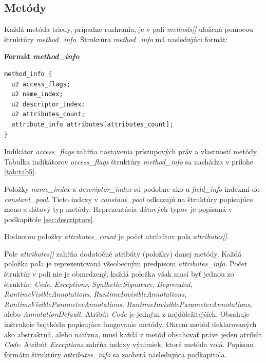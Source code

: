 \documentclass[11pt,final,oneside]{fithesis}
\newenvironment{example}[1]
{
\vspace{3mm}
\noindent\textbf{#1}
\vspace{2mm}
}
{
\vspace{3mm}
}
\begin{document}
\subsection{Metódy}
\label{sec:methods}
Každá metóda triedy, prípadne rozhrania, je v poli \textit{methods[]} uložená
pomocou štruktúry \textit{method\_info}. Štruktúra \textit{method\_info} má
nasledujúci formát:

\begin{example}{Formát \textit{method\_info}}
\begin{verbatim}
method_info {
  u2 access_flags;
  u2 name_index;
  u2 descriptor_index;
  u2 attributes_count;
  attribute_info attributes[attributes_count];
}
\end{verbatim}
\end{example}

Indikátor \textit{access\_flags} zahŕňa nastavenia prístupových práv a
vlastností metódy. Tabuľka indikátorov \textit{access\_flags} štruktúry
\textit{method\_info} sa nachádza v prílohe \ref{tab:tab5}.

Položky \textit{name\_index} a \textit{descriptor\_index} sú podobne ako u
\textit{field\_info} indexmi do \textit{constant\_pool}. Tieto indexy
v \textit{constant\_pool} odkazujú na štruktúry popisujúce meno a dátový typ
metódy. Reprezentácia dátových typov je popísaná v podkapitole
\ref{sec:descriptors}.

Hodnotou položky \textit{attributes\_count} je počet atribútov
poľa \textit{attributes[]}.

Pole \textit{attributes[]} zahŕňa dodatočné atribúty (položky) danej metódy.
Každá položka poľa je reprezentovaná všeobecným predpisom
\textit{attributes\_info}. Počet štruktúr v poli nie je obmedzený, každá
položka však musí byť jednou zo štruktúr: \textit{Code}, \textit{Exceptions},
\textit{Synthetic},\textit{Signature}, \textit{Deprecated},
\textit{RuntimeVisibleAnnotations}, \textit{RuntimeInvisibleAnnotations},
\textit{RuntimeVisibleParameterAnnotations},
\textit{RuntimeInvisibleParameterAnnotations},
alebo \textit{AnnotationDefault}.
Atribút \textit{Code} je jedným z najdôležitejších. Obsahuje inštrukcie
bajtkódu popisujúce fungovanie metódy. Okrem metód deklarovaných ako
abstraktná, alebo natívna, musí každá z metód obsahovať práve jeden atribút
\textit{Code}. Atribút \textit{Exceptions} zahŕňa indexy výnimiek, ktoré
metóda volá. Popisom formátu štruktúry \textit{attributes\_info} sa
zaoberá nasledujúca podkapitola.
\end{document}
